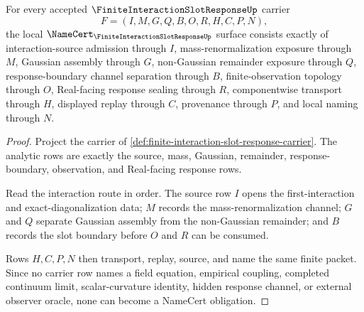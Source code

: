 \begin{theorem}
\label{thm:finite-interaction-slot-response-namecert-obligations}
For every accepted $\FiniteInteractionSlotResponseUp$ carrier
$$
F=(I,M,G,Q,B,O,R,H,C,P,N),
$$
the local $\NameCert_{\FiniteInteractionSlotResponseUp}$ surface consists exactly of interaction-source admission through $I$, mass-renormalization exposure through $M$, Gaussian assembly through $G$, non-Gaussian remainder exposure through $Q$, response-boundary channel separation through $B$, finite-observation topology through $O$, Real-facing response sealing through $R$, componentwise transport through $H$, displayed replay through $C$, provenance through $P$, and local naming through $N$.
\end{theorem}
\begin{proof}
Project the carrier of \autoref{def:finite-interaction-slot-response-carrier}. The analytic rows are exactly the source, mass, Gaussian, remainder, response-boundary, observation, and Real-facing response rows.

Read the interaction route in order. The source row $I$ opens the first-interaction and exact-diagonalization data; $M$ records the mass-renormalization channel; $G$ and $Q$ separate Gaussian assembly from the non-Gaussian remainder; and $B$ records the slot boundary before $O$ and $R$ can be consumed.

Rows $H,C,P,N$ then transport, replay, source, and name the same finite packet. Since no carrier row names a field equation, empirical coupling, completed continuum limit, scalar-curvature identity, hidden response channel, or external observer oracle, none can become a NameCert obligation.
\end{proof}

